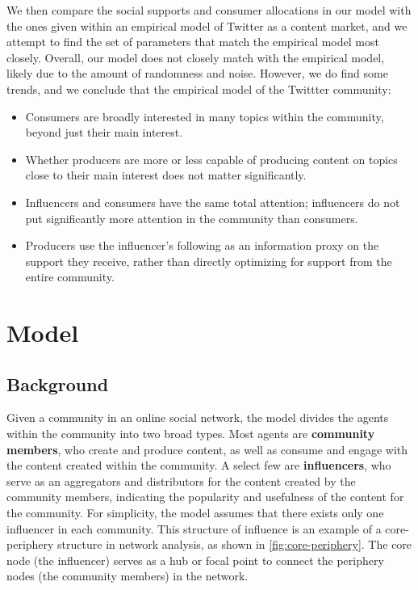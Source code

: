 \documentclass[11pt, letterpaper]{article}
\begin{document}
We then compare the social supports and consumer allocations in our model with the ones given within an empirical model of Twitter as a content market, and we attempt to find the set of parameters that match the empirical model most closely. Overall, our model does not closely match with the empirical model, likely due to the amount of randomness and noise. However, we do find some trends, and we conclude that the empirical model of the Twittter community: 
\begin{itemize}
    \item Consumers are broadly interested in many topics within the community, beyond just their main interest.
    \item Whether producers are more or less capable of producing content on topics close to their main interest does not matter significantly.
    \item Influencers and consumers have the same total attention; influencers do not put significantly more attention in the community than consumers.
    \item Producers use the influencer's following as an information proxy on the support they receive, rather than directly optimizing for support from the entire community.
\end{itemize}

\pagebreak

\section{Model}

\subsection{Background}

Given a community in an online social network, the model divides the agents within the community into two broad types. Most agents are \textbf{community members}, who create and produce content, as well as consume and engage with the content created within the community. A select few are \textbf{influencers}, who serve as an aggregators and distributors for the content created by the community members, indicating the popularity and usefulness of the content for the community. For simplicity, the model assumes that there exists only one influencer in each community. This structure of influence is an example of a core-periphery structure in network analysis, as shown in \cref{fig:core-periphery}. The core node (the influencer) serves as a hub or focal point to connect the periphery nodes (the community members) in the network.
\end{document}
